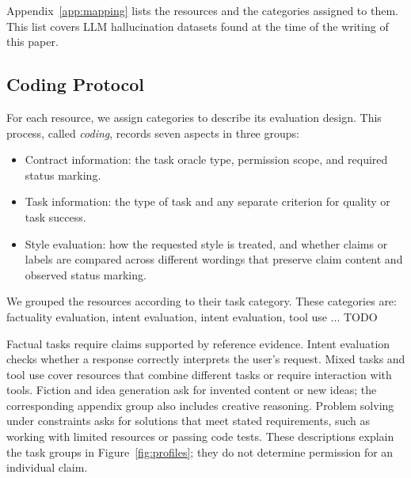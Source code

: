 \documentclass{clv2025}
\begin{document}
Appendix~\ref{app:mapping} lists the resources and the categories assigned to
them. This list covers LLM hallucination datasets found at the time of the writing of this paper. %

\subsection{Coding Protocol}

For each resource, we assign categories to describe its evaluation design.
This process, called \emph{coding}, records seven aspects in three groups:
\begin{itemize}
\item Contract information: the task oracle type, permission scope, and required
status marking.
\item Task information: the type of task and any separate criterion for
quality or task success.
\item Style evaluation: how the requested style is treated, and whether
claims or labels are compared across different wordings that preserve claim
content and observed status marking.
\end{itemize}
We grouped the resources according to their task category. These categories are: factuality evaluation, intent evaluation, intent evaluation, tool use ... TODO %

Factual tasks require claims supported by reference evidence. Intent
evaluation checks whether a response correctly interprets the user's
request. Mixed tasks and tool use cover resources that combine different
tasks or require interaction with tools. Fiction and idea generation ask
for invented content or new ideas; the corresponding appendix group also
includes creative reasoning. Problem solving under constraints asks for
solutions that meet stated requirements, such as working with limited
resources or passing code tests. These descriptions explain the task groups
in Figure~\ref{fig:profiles}; they do not determine permission for an
individual claim.
\end{document}
